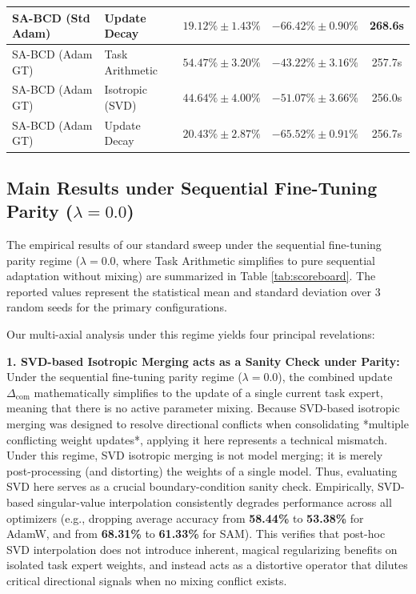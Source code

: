 \begin{table}[t]
\begin{center}
\begin{small}
\begin{sc}
\begin{tabular}{llccc}
    SA-BCD (Std Adam) & Update Decay & $19.12\% \pm 1.43\%$ & $-66.42\% \pm 0.90\%$ & 268.6s \\
    \midrule
    SA-BCD (Adam GT) & Task Arithmetic & $54.47\% \pm 3.20\%$ & $-43.22\% \pm 3.16\%$ & 257.7s \\
    SA-BCD (Adam GT) & Isotropic (SVD) & $44.64\% \pm 4.00\%$ & $-51.07\% \pm 3.66\%$ & 256.0s \\
    SA-BCD (Adam GT) & Update Decay & $20.43\% \pm 2.87\%$ & $-65.52\% \pm 0.91\%$ & 256.7s \\
    \bottomrule
  \end{tabular}
  \end{sc}
  \end{small}
  \end{center}
  \vskip -0.1in
\end{table}

\subsection{Main Results under Sequential Fine-Tuning Parity ($\lambda = 0.0$)}
The empirical results of our standard sweep under the sequential fine-tuning parity regime ($\lambda = 0.0$, where Task Arithmetic simplifies to pure sequential adaptation without mixing) are summarized in Table \ref{tab:scoreboard}. The reported values represent the statistical mean and standard deviation over 3 random seeds for the primary configurations.

Our multi-axial analysis under this regime yields four principal revelations:

\textbf{1. SVD-based Isotropic Merging acts as a Sanity Check under Parity:} Under the sequential fine-tuning parity regime ($\lambda = 0.0$), the combined update $\Delta_{\text{com}}$ mathematically simplifies to the update of a single current task expert, meaning that there is no active parameter mixing. Because SVD-based isotropic merging was designed to resolve directional conflicts when consolidating *multiple conflicting weight updates*, applying it here represents a technical mismatch. Under this regime, SVD isotropic merging is not model merging; it is merely post-processing (and distorting) the weights of a single model. Thus, evaluating SVD here serves as a crucial boundary-condition sanity check. Empirically, SVD-based singular-value interpolation consistently degrades performance across all optimizers (e.g., dropping average accuracy from \textbf{58.44\%} to \textbf{53.38\%} for AdamW, and from \textbf{68.31\%} to \textbf{61.33\%} for SAM). This verifies that post-hoc SVD interpolation does not introduce inherent, magical regularizing benefits on isolated task expert weights, and instead acts as a distortive operator that dilutes critical directional signals when no mixing conflict exists.

